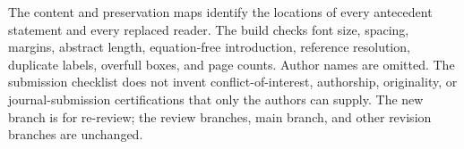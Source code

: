 \documentclass[11pt,letterpaper]{article}
\begin{document}
The content and preservation maps identify the locations of every antecedent statement and every replaced reader. The build checks font size, spacing, margins, abstract length, equation-free introduction, reference resolution, duplicate labels, overfull boxes, and page counts. Author names are omitted. The submission checklist does not invent conflict-of-interest, authorship, originality, or journal-submission certifications that only the authors can supply. The new branch is for re-review; the review branches, main branch, and other revision branches are unchanged.
\end{document}

